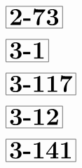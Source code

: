 \documentclass[a4paper, 10pt]{article}
\begin{document}
\begin{minipage}[t]{0.15\textwidth}
                \vspace*{-1.59cm}
        \hspace*{0.75cm}
        $\boxed{\textbf{\Huge2-73}}$
\end{minipage}
\begin{minipage}[t]{0.85\textwidth}
    
\end{minipage}

\begin{minipage}[t]{0.15\textwidth}
                \vspace*{-1.59cm}
        \hspace*{1.25cm}
        $\boxed{\textbf{\Huge3-1}}$
\end{minipage}
\begin{minipage}[t]{0.85\textwidth}
    
\end{minipage}

\begin{minipage}[t]{0.15\textwidth}
                \vspace*{-1.59cm}
        \hspace*{0.25cm}
        $\boxed{\textbf{\Huge3-117}}$
\end{minipage}
\begin{minipage}[t]{0.85\textwidth}
    
\end{minipage}

\begin{minipage}[t]{0.15\textwidth}
                \vspace*{-1.59cm}
        \hspace*{0.75cm}
        $\boxed{\textbf{\Huge3-12}}$
\end{minipage}
\begin{minipage}[t]{0.85\textwidth}
    
\end{minipage}

\begin{minipage}[t]{0.15\textwidth}
                \vspace*{-1.59cm}
        \hspace*{0.25cm}
        $\boxed{\textbf{\Huge3-141}}$
\end{minipage}
\begin{minipage}[t]{0.85\textwidth}
    
\end{minipage}
\end{document}
